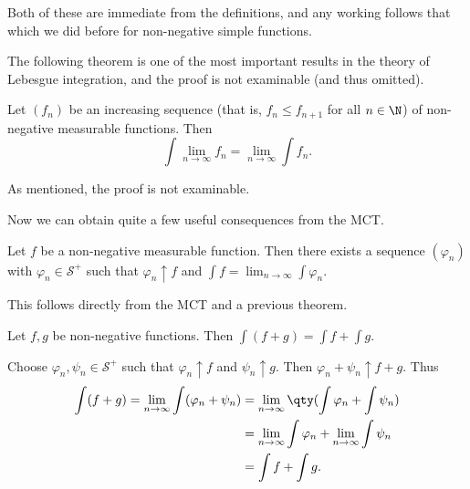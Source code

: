 \documentclass{maths}
\newcommand{\smpl}{\mathcal{S}}
\begin{document}
\begin{prf}
    Both of these are immediate from the definitions, and any working follows that which we did before for non-negative simple functions.
\end{prf}

The following theorem is one of the most important results in the theory of Lebesgue integration, and the proof is not examinable (and thus omitted).

\begin{thm}
    Let $(f_n)$ be an increasing sequence (that is, $f_n\leqslant f_{n+1}$ for all $n\in\N$) of non-negative measurable functions.
    Then
    \[
        \int \lim_{n\to\infty} f_n =
        \lim_{n\to\infty}\int f_n.
    \]
\end{thm}

\begin{prf}
    As mentioned, the proof is not examinable.
\end{prf}

Now we can obtain quite a few useful consequences from the MCT.

\begin{cor}
    Let $f$ be a non-negative measurable function.
    Then there exists a sequence $(\varphi_n)$ with $\varphi_n\in\smpl^+$ such that $\varphi_n\uparrow f$ and $\int f = \lim_{n\to\infty}\int \varphi_n$.
\end{cor}

\begin{prf}
    This follows directly from the MCT and a previous theorem.
\end{prf}

\begin{cor}
    Let $f,g$ be non-negative functions.
    Then $\int (f+g) = \int f + \int g$.
\end{cor}

\begin{prf}
    Choose $\varphi_n,\psi_n\in\smpl^+$ such that $\varphi_n\uparrow f$ and $\psi_n\uparrow g$.
    Then $\varphi_n+\psi_n\uparrow f+g$.
    Thus
    \begin{align*}
        \int (f + g) =
        \lim_{n\to\infty} \int (\varphi_n + \psi_n)
        &= \lim_{n\to\infty} \qty(\int \varphi_n + \int \psi_n)\\
        &= \lim_{n\to\infty} \int \varphi_n + \lim_{n\to\infty} \int \psi_n\\
        &= \int f+ \int g.
    \end{align*}
\end{prf}
\end{document}
